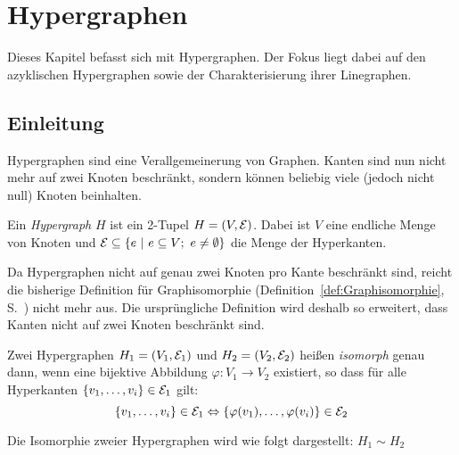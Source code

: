 \chapter{Hypergraphen}

Dieses Kapitel befasst sich mit Hypergraphen. Der Fokus liegt dabei auf den azyklischen Hypergraphen sowie der Charakterisierung ihrer Linegraphen.

\section{Einleitung}
Hypergraphen sind eine Verallgemeinerung von Graphen. Kanten sind nun nicht mehr auf zwei Knoten beschränkt, sondern können beliebig viele (jedoch nicht null) Knoten beinhalten.

\begin{mydef}
    Ein \emph{Hypergraph} $H$ ist ein 2-Tupel $H=(V,\mathcal{E})$.  Dabei ist $V$ eine endliche Menge von Knoten und $\mathcal{E} \subseteq \{e \ |\ e \subseteq V ;\ e \neq \emptyset\}$ die Menge der Hyperkanten.
\end{mydef}

Da Hypergraphen nicht auf genau zwei Knoten pro Kante beschränkt sind, reicht die bisherige Definition für Graphisomorphie (Definition~\ref{def:Graphisomorphie}, S.~\pageref{def:Graphisomorphie}) nicht mehr aus. Die ursprüngliche Definition wird deshalb so erweitert, dass Kanten nicht auf zwei Knoten beschränkt sind.
\begin{mydef}
    Zwei Hypergraphen $H_1 = (V_1,\mathcal{E}_1)$ und $H_2 = (V_2,\mathcal{E}_2)$ heißen \emph{isomorph} genau dann, wenn eine bijektive Abbildung $\varphi: V_1 \rightarrow V_2$ existiert, so dass für alle Hyperkanten $\{v_1,\ldots,v_i\} \in \mathcal{E}_1$ gilt: \[ \{v_1,\ldots,v_i\} \in \mathcal{E}_1 \Leftrightarrow \{\varphi(v_1), \ldots, \varphi(v_i)\} \in \mathcal{E}_2 \]
    
    Die Isomorphie zweier Hypergraphen wird wie folgt dargestellt: $H_1 \sim H_2$
\end{mydef}



